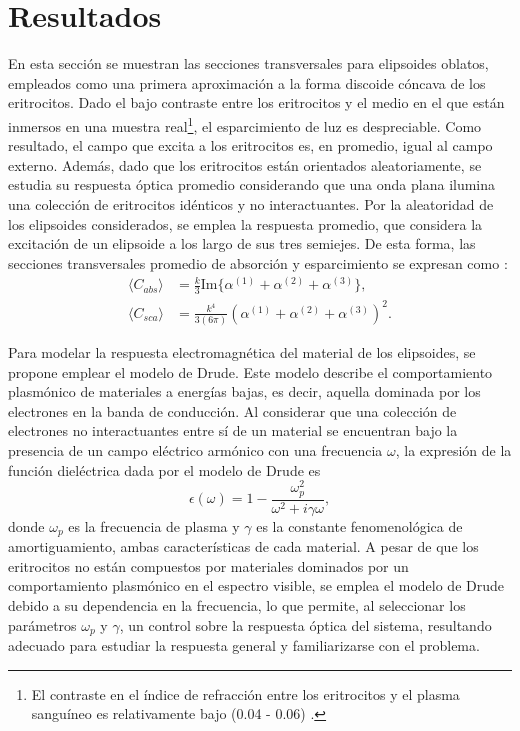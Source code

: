 	\hypertarget{resultados}{\section{Resultados}}
En esta sección se muestran las secciones transversales para elipsoides oblatos, empleados como una primera aproximación a la forma discoide cóncava de los eritrocitos. Dado el bajo contraste entre los eritrocitos y el medio en el que están inmersos en una muestra real\footnote{El contraste en el índice de refracción entre los eritrocitos y el plasma sanguíneo es relativamente bajo (0.04 - 0.06) \cite{Blood}.}, el esparcimiento de luz es despreciable. Como resultado, el campo que excita a los eritrocitos es, en promedio, igual al campo externo. Además, dado que los eritrocitos están orientados aleatoriamente, se estudia su respuesta óptica promedio considerando que una onda plana ilumina una colección de eritrocitos idénticos y no interactuantes. Por la aleatoridad de los elipsoides considerados, se emplea la respuesta promedio, que considera la excitación de un elipsoide a los largo de sus tres semiejes. De esta forma, las secciones transversales promedio de absorción y esparcimiento se expresan como \cite{Bohren}:
\begin{align*}
	\langle C_{abs}\rangle &= \frac{k}{3} \text{Im}\{\alpha^{(1)}+\alpha^{(2)}+\alpha^{(3)}\},\\
	\langle C_{sca}\rangle &= \frac{k^4}{3(6\pi)} \left(\alpha^{(1)}+\alpha^{(2)}+\alpha^{(3)}\right)^2.
\end{align*}

Para modelar la respuesta electromagnética del material de los elipsoides, se propone emplear el modelo de Drude. Este modelo describe el comportamiento plasmónico de materiales a energías bajas, es decir, aquella dominada por los electrones en la banda de conducción. Al considerar que una colección de electrones no interactuantes entre sí de un material se encuentran bajo la presencia de un campo eléctrico armónico con una frecuencia $\omega$, la expresión de la función dieléctrica dada por el modelo de Drude es \cite{Plasmonics}
\begin{equation} \epsilon(\omega) = 1 - \frac{\omega_p^2}{\omega^2 + i\gamma\omega}, 
\label{Drude}
\end{equation}
donde $\omega_p$ es la frecuencia de plasma y $\gamma$ es la constante fenomenológica de amortiguamiento, ambas características de cada material. A pesar de  que los eritrocitos no están compuestos por materiales dominados por un comportamiento plasmónico en el espectro visible, se emplea el modelo de Drude debido a su dependencia en la frecuencia, lo que permite, al seleccionar los parámetros $\omega_p$ y $\gamma$, un control sobre la respuesta óptica del sistema, resultando adecuado para estudiar la respuesta general y familiarizarse con el problema.\\

